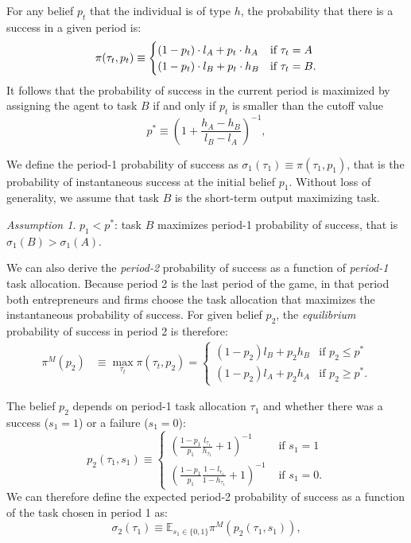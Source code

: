 \documentclass[12pt,american]{paper}
\theoremstyle{remark}
\newtheorem{ass}{Assumption}
\begin{document}
For any  belief  $p_t$  that the individual is of type $h$, the probability that there is a success in a given period is: 
\begin{equation}\label{eq:pr of success}
\pi(\tau_t,p_t)\equiv \begin{cases}
(1-p_t)\cdot l_A + p_t \cdot h_A  &\mbox{if } \tau_t=A\\
(1-p_t) \cdot l_B + p_t \cdot h_B  &\mbox{if } \tau_t=B.
\end{cases}\notag
\end{equation}
%
It follows that the probability of success in the current period is maximized by assigning the agent to task $B$ if and only if $p_t$ is smaller than the cutoff value
\begin{equation}
p^* \equiv \left(1+ \frac{h_A-h_B}{l_B-l_A} \right)^{-1},
\end{equation}
%

We define the period-1 probability of success as  $\sigma_1(\tau_1) \equiv \pi(\tau_1,p_1)$, that is the probability of instantaneous success at the initial belief $p_1$. Without loss of generality, we assume that task $B$ is the short-term output maximizing task.
\begin{ass}\label{ass:sigma1}
$p_1<p^*$: task $B$ maximizes period-1 probability of success, that is $\sigma_1(B)>\sigma_1(A)$.
\end{ass}
We can also derive the \textit{period-2} probability of success as a function of \textit{period-1} task allocation. Because period 2 is the last period of the game, in that period both entrepreneurs and firms choose the task allocation that maximizes the instantaneous probability of success. For given belief $p_2$, the \textit{equilibrium} probability of success in period 2 is therefore:
\begin{align}\label{maxp}
\pi^M(p_2)&\equiv\max_{\tau_t}\pi(\tau_t,p_2)
=\begin{cases} 
(1-p_2) l_B + p_2 h_B &\mbox{if } p_2 \leq p^*\\
(1-p_2) l_A + p_2 h_A & \mbox{if } p_2 \geq p^* .
\end{cases}
\end{align}

The belief $p_2$ depends on period-1 task allocation $\tau_1$ and whether there was a success ($s_1=1$) or a failure ($s_1=0$):
\[p_2(\tau_1,s_1)\equiv \begin{cases} 
\left(\frac{1-p_1}{p_1}\frac{l_{\tau_1}}{h_{\tau_1}}+1\right)^{-1} &\mbox{ if } s_1=1\\
\left(\frac{1-p_1}{p_1}\frac{1-l_{\tau_1}}{1-h_{\tau_1}}+1\right)^{-1} &\mbox{ if } s_1=0.
\end{cases}
\]
We can therefore define the expected period-2 probability of success as a function of the task chosen in period 1 as:
\begin{equation*}
\sigma_2(\tau_1) \equiv \mathbb E_{s_1\in\{0,1\}}\pi^M (p_2(\tau_1,s_1)),
\end{equation*}
\end{document}
